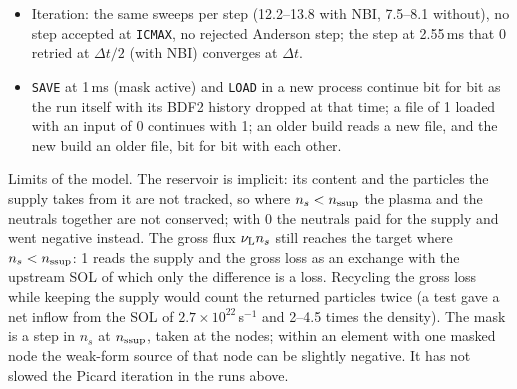 \documentclass[11pt]{article}
\def\r#1{{\rm#1}}
\def\nz{n_\r{z}}
\def\nsup#1{n_\r{#1sup}}
\def\nuL{\nu_\r{L}}
\begin{document}
\begin{itemize}
  $1.7\times10^{-4}$ in $\nz$ with NBI, 0.37\% and $8.5\times10^{-5}$ without.
\item Iteration: the same sweeps per step (12.2--13.8 with NBI, 7.5--8.1 without), no step
  accepted at \texttt{ICMAX}, no rejected Anderson step; the step at 2.55\,ms that 0 retried at
  $\Delta t/2$ (with NBI) converges at $\Delta t$.
\item \texttt{SAVE} at 1\,ms (mask active) and \texttt{LOAD} in a new process continue bit for bit
  as the run itself with its BDF2 history dropped at that time; a file of 1 loaded with an
  input of 0 continues with 1; an older build reads a new file, and the new build an older
  file, bit for bit with each other.
\end{itemize}

Limits of the model.  The reservoir is implicit: its content and the particles the
supply takes from it are not tracked, so where $n_s<\nsup{s}$ the plasma and the
neutrals together are not conserved; with 0 the neutrals paid for the supply and
went negative instead.  The gross flux $\nuL n_s$ still reaches the target where
$n_s<\nsup{s}$: 1 reads the supply and the gross loss as an exchange with the
upstream SOL of which only the difference is a loss.  Recycling the gross loss
while keeping the supply would count the returned particles twice (a test gave a
net inflow from the SOL of $2.7\times10^{22}$\,s$^{-1}$ and 2--4.5 times the density).
The mask is a step in $n_s$ at $\nsup{s}$, taken at the nodes; within an element
with one masked node the weak-form source of that node can be slightly negative.
It has not slowed the Picard iteration in the runs above.
\end{document}
